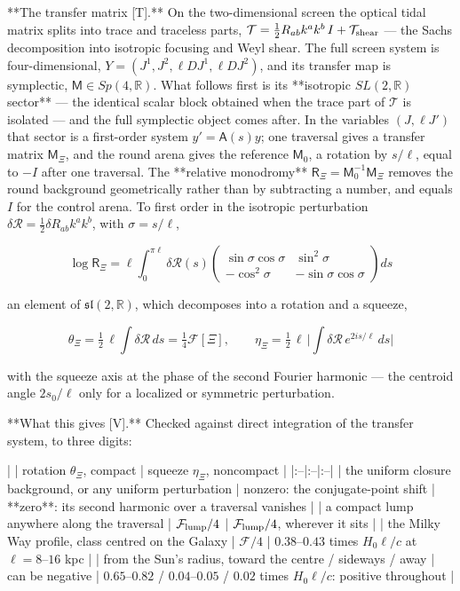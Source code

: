 **The transfer matrix [T].** On the two-dimensional screen the optical tidal matrix splits into trace and traceless parts, $\mathcal T = \tfrac12R_{ab}k^ak^b\,I+\mathcal T_{\rm shear}$ — the Sachs decomposition into isotropic focusing and Weyl shear. The full screen system is four-dimensional, $Y = (J^1,J^2,\ell DJ^1,\ell DJ^2)$, and its transfer map is symplectic, $\mathsf M\in Sp(4,\mathbb R)$. What follows first is its **isotropic $SL(2,\mathbb R)$ sector** — the identical scalar block obtained when the trace part of $\mathcal T$ is isolated — and the full symplectic object comes after. In the variables $(J,\ell J')$ that sector is a first-order system $y' = \mathsf A(s)y$; one traversal gives a transfer matrix $\mathsf M_\Xi$, and the round arena gives the reference $\mathsf M_0$, a rotation by $s/\ell$, equal to $-I$ after one traversal. The **relative monodromy** $\mathsf R_\Xi = \mathsf M_0^{-1}\mathsf M_\Xi$ removes the round background geometrically rather than by subtracting a number, and equals $I$ for the control arena. To first order in the isotropic perturbation $\delta\mathcal R = \tfrac12\delta R_{ab}k^ak^b$, with $\sigma = s/\ell$,

$$\log\mathsf R_\Xi = \ell\int_0^{\pi\ell}\delta\mathcal R(s)\begin{pmatrix}\sin\sigma\cos\sigma & \sin^2\sigma\\ -\cos^2\sigma & -\sin\sigma\cos\sigma\end{pmatrix}ds$$

an element of $\mathfrak{sl}(2,\mathbb R)$, which decomposes into a rotation and a squeeze,

$$\theta_\Xi = \tfrac12\,\ell\!\int\!\delta\mathcal R\,ds = \tfrac14\mathcal F[\Xi],\qquad \eta_\Xi = \tfrac12\,\ell\,\Big|\int\delta\mathcal R\,e^{2is/\ell}\,ds\Big|$$

with the squeeze axis at the phase of the second Fourier harmonic — the centroid angle $2s_0/\ell$ only for a localized or symmetric perturbation.

**What this gives [V].** Checked against direct integration of the transfer system, to three digits:

| | rotation $\theta_\Xi$, compact | squeeze $\eta_\Xi$, noncompact |
|:--|:--|:--|
| the uniform closure background, or any uniform perturbation | nonzero: the conjugate-point shift | **zero**: its second harmonic over a traversal vanishes |
| a compact lump anywhere along the traversal | $\mathcal F_{\rm lump}/4$ | $\mathcal F_{\rm lump}/4$, wherever it sits |
| the Milky Way profile, class centred on the Galaxy | $\mathcal F/4$ | $0.38$–$0.43$ times $H_0\ell/c$ at $\ell = 8$–$16$ kpc |
| from the Sun's radius, toward the centre / sideways / away | can be negative | $0.65$–$0.82$ / $0.04$–$0.05$ / $0.02$ times $H_0\ell/c$: positive throughout |

